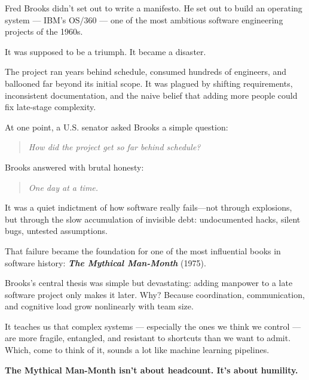 \begin{tcolorbox}[title=Historical Sidebar: “One Day at a Time” — How Software Became Self-Aware, colback=gray!5!white, colframe=black!80!white, breakable, fonttitle=\bfseries]

    Fred Brooks didn’t set out to write a manifesto.  He set out to build an operating system — IBM’s OS/360 — one of the most ambitious software engineering projects of the 1960s.

    \medskip
    
    It was supposed to be a triumph. It became a disaster.

    \medskip
    
    The project ran years behind schedule, consumed hundreds of engineers, and ballooned far beyond its initial scope. It was plagued by shifting requirements, inconsistent documentation, and the naive belief that adding more people could fix late-stage complexity.

    \medskip
    
    At one point, a U.S. senator asked Brooks a simple question:
    
    \begin{quote}
    \textit{How did the project get so far behind schedule?}
    \end{quote}
    
    Brooks answered with brutal honesty:
    
    \begin{quote}
    \textit{One day at a time.}
    \end{quote}
    
    It was a quiet indictment of how software really fails—not through explosions, but through the slow accumulation of invisible debt: undocumented hacks, silent bugs, untested assumptions.

    \medskip
    
    That failure became the foundation for one of the most influential books in software history:  \textbf{\textit{The Mythical Man-Month}} (1975).

    \medskip
    
    Brooks’s central thesis was simple but devastating:  adding manpower to a late software project only makes it later.  Why? Because coordination, communication, and cognitive load grow nonlinearly with team size.

    \medskip
    
    It teaches us that complex systems — especially the ones we think we control — are more fragile, entangled, and resistant to shortcuts than we want to admit.  Which, come to think of it, sounds a lot like machine learning pipelines.

    \medskip
    
    \textbf{The Mythical Man-Month isn’t about headcount. It’s about humility.}
    
\end{tcolorbox}

